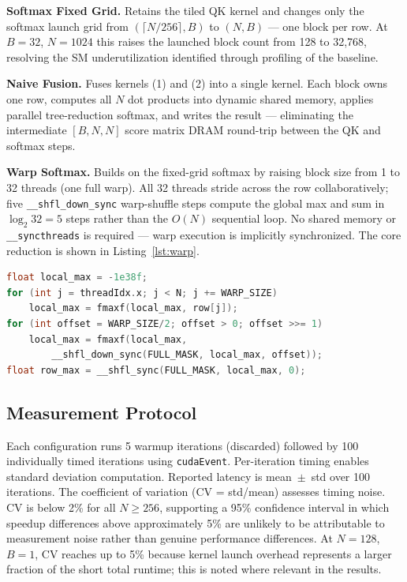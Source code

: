 \documentclass{article}
\begin{document}
\textbf{Softmax Fixed Grid.} Retains the tiled QK kernel and changes only
the softmax launch grid from $(\lceil N/256\rceil,B)$ to $(N,B)$ — one
block per row. At $B{=}32$, $N{=}1024$ this raises the launched block count
from 128 to 32,768, resolving the SM underutilization identified through
profiling of the baseline.

\textbf{Naive Fusion.} Fuses kernels (1) and (2) into a single kernel. Each
block owns one row, computes all $N$ dot products into dynamic shared memory,
applies parallel tree-reduction softmax, and writes the result — eliminating
the intermediate $[B,N,N]$ score matrix DRAM round-trip between the QK and
softmax steps.

\textbf{Warp Softmax.} Builds on the fixed-grid softmax by raising block
size from 1 to 32 threads (one full warp). All 32 threads stride across the
row collaboratively; five \texttt{\_\_shfl\_down\_sync} warp-shuffle steps
compute the global max and sum in $\log_2 32{=}5$ steps rather than the
$O(N)$ sequential loop. No shared memory or \texttt{\_\_syncthreads} is
required — warp execution is implicitly synchronized. The core reduction
is shown in Listing~\ref{lst:warp}.

\begin{lstlisting}[language=C,
  caption={Warp-level max reduction using shuffle instructions.},
  label={lst:warp}]
float local_max = -1e38f;
for (int j = threadIdx.x; j < N; j += WARP_SIZE)
    local_max = fmaxf(local_max, row[j]);
for (int offset = WARP_SIZE/2; offset > 0; offset >>= 1)
    local_max = fmaxf(local_max,
        __shfl_down_sync(FULL_MASK, local_max, offset));
float row_max = __shfl_sync(FULL_MASK, local_max, 0);
\end{lstlisting}

\subsection{Measurement Protocol}

Each configuration runs 5 warmup iterations (discarded) followed by 100
individually timed iterations using \texttt{cudaEvent}. Per-iteration timing
enables standard deviation computation. Reported latency is mean~$\pm$~std
over 100 iterations. The coefficient of variation (CV = std/mean) assesses
timing noise. CV is below 2\% for all $N\geq256$, supporting a 95\%
confidence interval in which speedup differences above approximately 5\%
are unlikely to be attributable to measurement noise rather than genuine
performance differences. At $N{=}128$, $B{=}1$, CV reaches up to 5\%
because kernel launch overhead represents a larger fraction of the short
total runtime; this is noted where relevant in the results.
\end{document}

